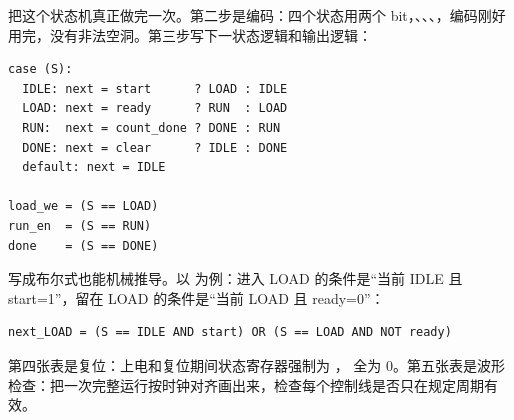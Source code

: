 把这个状态机真正做完一次。第二步是编码：四个状态用两个 bit，、、、，编码刚好用完，没有非法空洞。第三步写下一状态逻辑和输出逻辑：

\begin{lstlisting}
case (S):
  IDLE: next = start      ? LOAD : IDLE
  LOAD: next = ready      ? RUN  : LOAD
  RUN:  next = count_done ? DONE : RUN
  DONE: next = clear      ? IDLE : DONE
  default: next = IDLE

load_we = (S == LOAD)
run_en  = (S == RUN)
done    = (S == DONE)
\end{lstlisting}

写成布尔式也能机械推导。以  为例：进入 LOAD 的条件是“当前 IDLE 且 start=1”，留在 LOAD 的条件是“当前 LOAD 且 ready=0”：

\begin{lstlisting}
next_LOAD = (S == IDLE AND start) OR (S == LOAD AND NOT ready)
\end{lstlisting}

第四张表是复位：上电和复位期间状态寄存器强制为 ， 全为 0。第五张表是波形检查：把一次完整运行按时钟对齐画出来，检查每个控制线是否只在规定周期有效。


